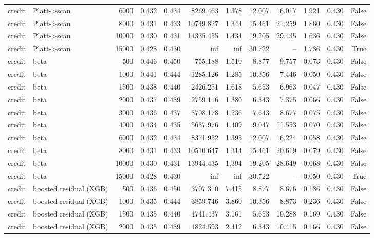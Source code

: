 \begin{tabular}{llrrrrrrrrrr}
credit & Platt->scan & 6000 & 0.432 & 0.434 & 8269.463 & 1.378 & 12.007 & 16.017 & 1.921 & 0.430 & False \\
credit & Platt->scan & 8000 & 0.431 & 0.433 & 10749.827 & 1.344 & 15.461 & 21.259 & 1.860 & 0.430 & False \\
credit & Platt->scan & 10000 & 0.430 & 0.431 & 14335.455 & 1.434 & 19.205 & 29.435 & 1.636 & 0.430 & False \\
credit & Platt->scan & 15000 & 0.428 & 0.430 & inf & inf & 30.722 & -- & 1.736 & 0.430 & True \\
credit & beta & 500 & 0.446 & 0.450 & 755.188 & 1.510 & 8.877 & 9.757 & 0.073 & 0.430 & False \\
credit & beta & 1000 & 0.441 & 0.444 & 1285.126 & 1.285 & 10.356 & 7.446 & 0.050 & 0.430 & False \\
credit & beta & 1500 & 0.438 & 0.440 & 2426.251 & 1.618 & 5.653 & 6.963 & 0.047 & 0.430 & False \\
credit & beta & 2000 & 0.437 & 0.439 & 2759.116 & 1.380 & 6.343 & 7.375 & 0.066 & 0.430 & False \\
credit & beta & 3000 & 0.436 & 0.437 & 3708.178 & 1.236 & 7.643 & 8.677 & 0.075 & 0.430 & False \\
credit & beta & 4000 & 0.434 & 0.435 & 5637.976 & 1.409 & 9.047 & 11.553 & 0.070 & 0.430 & False \\
credit & beta & 6000 & 0.432 & 0.434 & 8371.952 & 1.395 & 12.007 & 16.224 & 0.058 & 0.430 & False \\
credit & beta & 8000 & 0.431 & 0.433 & 10510.647 & 1.314 & 15.461 & 20.619 & 0.079 & 0.430 & False \\
credit & beta & 10000 & 0.430 & 0.431 & 13944.435 & 1.394 & 19.205 & 28.649 & 0.068 & 0.430 & False \\
credit & beta & 15000 & 0.428 & 0.430 & inf & inf & 30.722 & -- & 0.050 & 0.430 & True \\
credit & boosted residual (XGB) & 500 & 0.436 & 0.450 & 3707.310 & 7.415 & 8.877 & 8.676 & 0.186 & 0.430 & False \\
credit & boosted residual (XGB) & 1000 & 0.435 & 0.444 & 3859.746 & 3.860 & 10.356 & 8.873 & 0.236 & 0.430 & False \\
credit & boosted residual (XGB) & 1500 & 0.435 & 0.440 & 4741.437 & 3.161 & 5.653 & 10.288 & 0.169 & 0.430 & False \\
credit & boosted residual (XGB) & 2000 & 0.435 & 0.439 & 4824.593 & 2.412 & 6.343 & 10.415 & 0.166 & 0.430 & False \\

\end{tabular}
